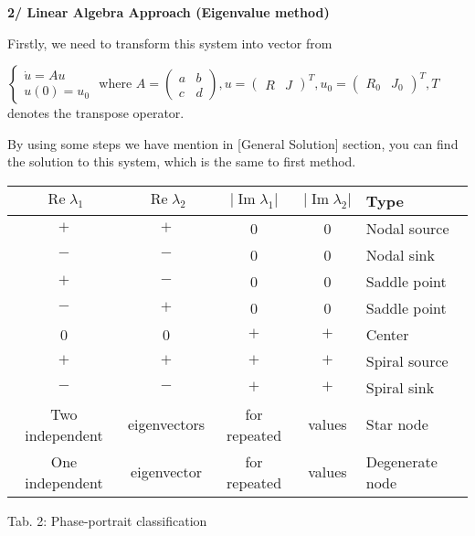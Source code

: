 \documentclass[a4paper]{article}
\begin{document}
{\bf  2/ Linear Algebra Approach (Eigenvalue method)}

Firstly, we need to transform this system into vector from

$\left\{\begin{array}{l}\dot{u}=A u \\ u(0)=u_{0}\end{array}\right.$ where $A=\left(\begin{array}{ll}a & b \\ c & d\end{array}\right), u=\left(\begin{array}{ll}R & J\end{array}\right)^{T}, u_{0}=\left(\begin{array}{ll}R_{0} & J_{0}\end{array}\right)^{T}, T$ denotes the transpose
operator.

By using some steps we have mention in [General Solution] section, you can find the solution to this system, which is the same to first method.

\begin{center}
	\begin{tabular}{ccccl}
		\hline $\operatorname{Re} \lambda_1$ & $\operatorname{Re} \lambda_2$ & $\left|\operatorname{Im} \lambda_1\right|$ & $\left|\operatorname{Im} \lambda_2\right|$ & Type \\
		\hline
            $+$ & $+$ & 0 & 0 & Nodal source \\
            $-$ & $-$ & 0 & 0 & Nodal sink \\
            $+$ & $-$ & 0 & 0 & Saddle point \\
            $-$ & $+$ & 0 & 0 & Saddle point \\
            0 & 0 & $+$ & $+$ & Center \\
            $+$ & $+$ & $+$ & $+$ & Spiral source \\
            $-$ & $-$ & $+$ & $+$ & Spiral sink \\
        Two independent& eigenvectors& for repeated& values  & Star node \\
        One independent& eigenvector& for repeated& values  & Degenerate node \\
		\hline
	\end{tabular}
\end{center}

\begin{center}
	
	Tab. 2: Phase-portrait classification
	
\end{center}
\end{document}
